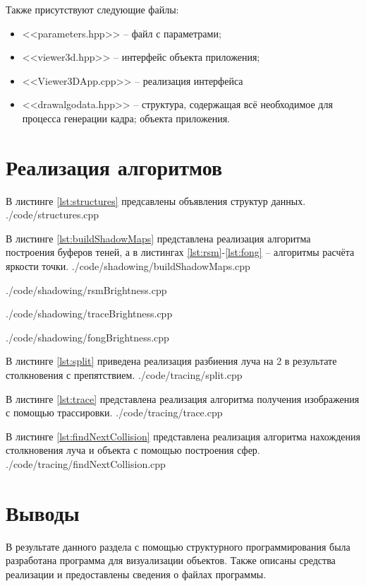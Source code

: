 {        Также присутствуют следующие файлы:
        \begin{itemize}
            \item <<parameters.hpp>> -- файл с параметрами;
            \item <<viewer3d.hpp>> -- интерфейс объекта приложения;
            \item <<Viewer3DApp.cpp>> -- реализация интерфейса
            \item <<drawalgodata.hpp>> -- структура, содержащая всё
            необходимое для процесса генерации кадра;
            объекта приложения.
        \end{itemize}
    }

\section{Реализация алгоритмов} {
    В листинге \ref{lst:structures} предсавлены объявления структур данных.
     {./code/structures.cpp}
    
    В листинге \ref{lst:buildShadowMaps} представлена реализация алгоритма
    построения буферов теней, а в листингах \ref{lst:rsm}-\ref{lst:fong} --
    алгоритмы расчёта яркости точки.
     {./code/shadowing/buildShadowMaps.cpp}

     {./code/shadowing/rsmBrightness.cpp}
        
     {./code/shadowing/traceBrightness.cpp}

     {./code/shadowing/fongBrightness.cpp}

    В листинге \ref{lst:split} приведена реализация разбиения луча на 2
    в результате столкновения с препятствием.
     {./code/tracing/split.cpp}

    В листинге \ref{lst:trace} представлена реализация алгоритма получения
    изображения с помощью трассировки.
     {./code/tracing/trace.cpp}

    В листинге \ref{lst:findNextCollision} представлена реализация алгоритма нахождения
    столкновения луча и объекта с помощью построения сфер.
     {./code/tracing/findNextCollision.cpp}
}

\section*{Выводы}
В результате данного раздела с помощью структурного программирования
была разработана программа для визуализации объектов.
Также описаны средства реализации и предоставлены сведения о файлах
программы.